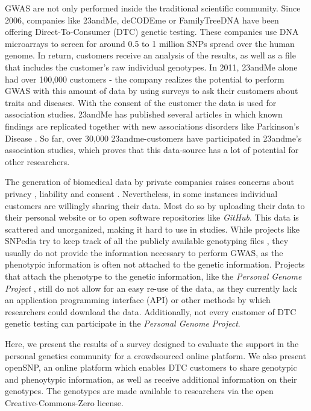 \documentclass[10pt]{article}
\begin{document}
GWAS are not only performed inside the traditional scientific community. 
Since 2006, companies like 23andMe, deCODEme or FamilyTreeDNA have been offering Direct-To-Consumer (DTC) genetic testing. 
These companies use DNA microarrays to screen for around 0.5 to 1 million SNPs spread over the human genome. In return, customers 
receive an analysis of the results, as well as a file that includes the customer's raw individual genotypes. In 2011, 23andMe 
alone had over 100,000 customers \cite{23andMe2011}
- the company realizes the potential to perform GWAS with this amount of data by using surveys to ask their customers about 
traits and diseases. With the consent of the customer the data is used for association studies. 23andMe has published several 
articles in which known findings are replicated together with new associations disorders like Parkinson's Disease \cite{Eriksson2010, Do2011}. 
So far, over 30,000 23andme-customers have participated in 23andme's association studies, which proves that this data-source has a lot of potential for other researchers.

The generation of biomedical data by private companies raises concerns about privacy \cite{23andMe2012}, 
liability and consent \cite{Caulfield2011}. 
Nevertheless, in some instances individual customers are willingly sharing their data. Most do so by uploading their data to
their personal website or to open software repositories like \textit{GitHub}. 
This data is scattered and unorganized, making it hard to use in studies. While projects like SNPedia try to keep track of all 
the publicly available genotyping files \cite{Cariaso2011}, they usually do not provide the information necessary to perform GWAS, as the phenotypic information is 
often not attached to the genetic information. Projects that attach the phenotype to the genetic information, 
like the \textit{Personal Genome Project} \cite{Ball24072012}, still do not allow for an easy re-use of the data, as they currently lack an application programming interface (API) 
or other methods by which researchers could download the data. Additionally, not every customer of DTC genetic testing can participate in the \textit{Personal Genome Project}.  

Here, we present the results of a survey designed to evaluate the support in the personal genetics community for a crowdsourced online platform. We also present openSNP, an online platform which enables DTC customers to share genotypic and phenoytypic information, as well as receive additional information on their genotypes. The genotypes are made available to researchers via the open Creative-Commons-Zero license.
\end{document}
